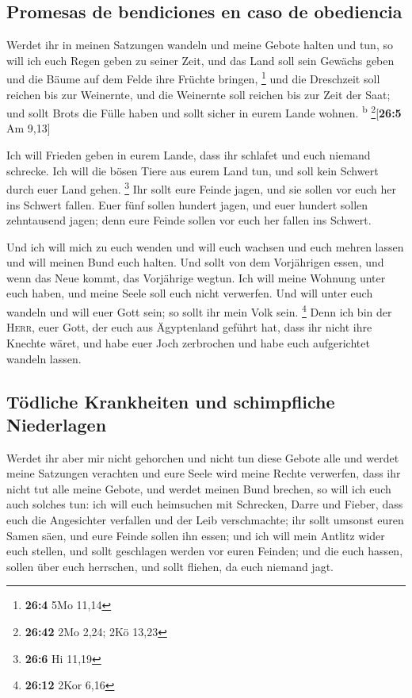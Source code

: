 \hypertarget{promesas-de-bendiciones-en-caso-de-obediencia}{%
\subsection{Promesas de bendiciones en caso de
obediencia}\label{promesas-de-bendiciones-en-caso-de-obediencia}}

 Werdet ihr in meinen Satzungen wandeln und meine Gebote
halten und tun,  so will ich euch Regen geben zu seiner
Zeit, und das Land soll sein Gewächs geben und die Bäume auf dem Felde
ihre Früchte bringen, \footnote{\textbf{26:4} 5Mo 11,14} 
und die Dreschzeit soll reichen bis zur Weinernte, und die Weinernte
soll reichen bis zur Zeit der Saat; und sollt Brots die Fülle haben und
sollt sicher in eurem Lande wohnen. \textsuperscript{b}
\footnote{\textbf{26:42} 2Mo 2,24; 2Kö 13,23}{[}\textbf{26:5} Am 9,13{]}

 Ich will Frieden geben in eurem Lande, dass ihr schlafet
und euch niemand schrecke. Ich will die bösen Tiere aus eurem Land tun,
und soll kein Schwert durch euer Land gehen. \footnote{\textbf{26:6} Hi
  11,19}  Ihr sollt eure Feinde jagen, und sie sollen vor
euch her ins Schwert fallen.  Euer fünf sollen hundert
jagen, und euer hundert sollen zehntausend jagen; denn eure Feinde
sollen vor euch her fallen ins Schwert.

 Und ich will mich zu euch wenden und will euch wachsen
und euch mehren lassen und will meinen Bund euch halten. 
Und sollt von dem Vorjährigen essen, und wenn das Neue kommt, das
Vorjährige wegtun.  Ich will meine Wohnung unter euch
haben, und meine Seele soll euch nicht verwerfen.  Und
will unter euch wandeln und will euer Gott sein; so sollt ihr mein Volk
sein. \footnote{\textbf{26:12} 2Kor 6,16}  Denn ich bin
der \textsc{Herr}, euer Gott, der euch aus Ägyptenland geführt hat, dass
ihr nicht ihre Knechte wäret, und habe euer Joch zerbrochen und habe
euch aufgerichtet wandeln lassen.

\hypertarget{tuxf6dliche-krankheiten-und-schimpfliche-niederlagen}{%
\subsection{Tödliche Krankheiten und schimpfliche
Niederlagen}\label{tuxf6dliche-krankheiten-und-schimpfliche-niederlagen}}

 Werdet ihr aber mir nicht gehorchen und nicht tun diese
Gebote alle  und werdet meine Satzungen verachten und
eure Seele wird meine Rechte verwerfen, dass ihr nicht tut alle meine
Gebote, und werdet meinen Bund brechen,  so will ich euch
auch solches tun: ich will euch heimsuchen mit Schrecken, Darre und
Fieber, dass euch die Angesichter verfallen und der Leib verschmachte;
ihr sollt umsonst euren Samen säen, und eure Feinde sollen ihn essen;
 und ich will mein Antlitz wider euch stellen, und sollt
geschlagen werden vor euren Feinden; und die euch hassen, sollen über
euch herrschen, und sollt fliehen, da euch niemand jagt.

